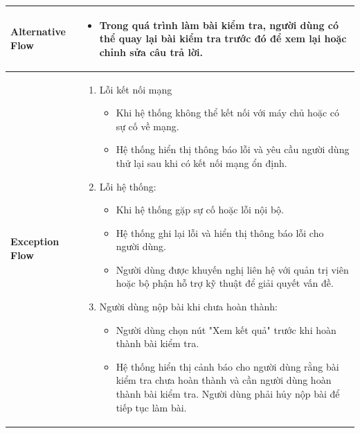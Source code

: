 \begin{longtable}[H]{|l|p{}|}
        \hline
        
        \textbf{Alternative Flow} & \vspace{-1cm} \begin{itemize}[leftmargin=4mm]
            \setlength\itemsep{0em}
            \item Trong quá trình làm bài kiểm tra, người dùng có thể quay lại bài kiểm tra trước đó để xem lại hoặc chỉnh sửa câu trả lời.
        \end{itemize} \\
        
        \hline 
        
        \textbf{Exception Flow} & \vspace{-1cm} \begin{enumerate} [leftmargin=5.5mm]
            \setlength\itemsep{0em}
            \item Lỗi kết nối mạng
                \begin{itemize}
                    \setlength\itemsep{0em}
                    \item Khi hệ thống không thể kết nối với máy chủ hoặc có sự cố về mạng.
                    \item Hệ thống hiển thị thông báo lỗi và yêu cầu người dùng thử lại sau khi có kết nối mạng ổn định.
                \end{itemize}
            \item Lỗi hệ thống:
                \begin{itemize}
                    \setlength\itemsep{0em}
                    \item Khi hệ thống gặp sự cố hoặc lỗi nội bộ.
                    \item Hệ thống ghi lại lỗi và hiển thị thông báo lỗi cho người dùng.
                    \item Người dùng được khuyến nghị liên hệ với quản trị viên hoặc bộ phận hỗ trợ kỹ thuật để giải quyết vấn đề.
                \end{itemize}
            \item Người dùng nộp bài khi chưa hoàn thành:
                \begin{itemize}
                    \setlength\itemsep{0em}
                    \item Người dùng chọn nút "Xem kết quả" trước khi hoàn thành bài kiểm tra.
                    \item  Hệ thống hiển thị cảnh báo cho người dùng rằng bài kiểm tra chưa hoàn thành và cần người dùng hoàn thành bài kiểm tra. Người dùng phải hủy nộp bài để tiếp tục làm bài.
                \end{itemize}
        \end{enumerate}\\
        \hline 
    
    \end{longtable}

